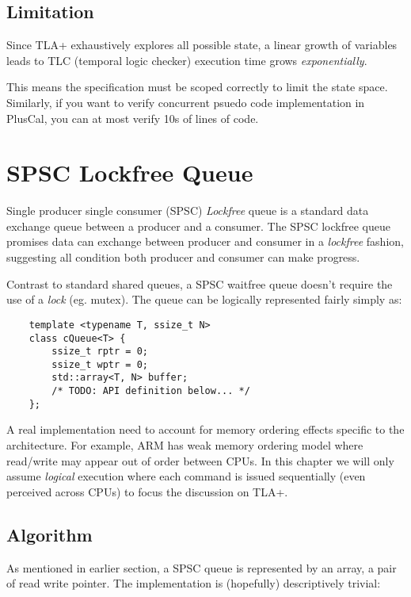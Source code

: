 \documentclass{report}
\begin{document}
\section{Limitation}

Since TLA+ exhaustively explores all possible state, a linear growth of
variables leads to TLC (temporal logic checker) execution time grows
\textit{exponentially}.\newline

This means the specification must be scoped correctly to limit the state space.
Similarly, if you want to verify concurrent psuedo code implementation in
PlusCal, you can at most verify 10s of lines of code.

\chapter{SPSC Lockfree Queue}

Single producer single consumer (SPSC) \textit{Lockfree} queue is a standard
data exchange queue between a producer and a consumer. The SPSC lockfree queue
promises data can exchange between producer and consumer in a \textit{lockfree}
fashion, suggesting all condition both producer and consumer can make
progress.\newline

Contrast to standard shared queues, a SPSC waitfree queue doesn't require the
use of a \textit{lock} (eg. mutex). The queue can be logically represented
fairly simply as:

\begin{lstlisting}
    template <typename T, ssize_t N>
    class cQueue<T> { 
        ssize_t rptr = 0; 
        ssize_t wptr = 0; 
        std::array<T, N> buffer;
        /* TODO: API definition below... */
    };
\end{lstlisting}

A real implementation need to account for memory ordering effects specific to
the architecture. For example, ARM has weak memory ordering model where
read/write may appear out of order between CPUs. In this chapter we will only
assume \textit{logical} execution where each command is issued sequentially
(even perceived across CPUs) to focus the discussion on TLA+.
\section{Algorithm}

As mentioned in earlier section, a SPSC queue is represented by an array, a pair
of read write pointer. The implementation is (hopefully) descriptively trivial:
\end{document}
